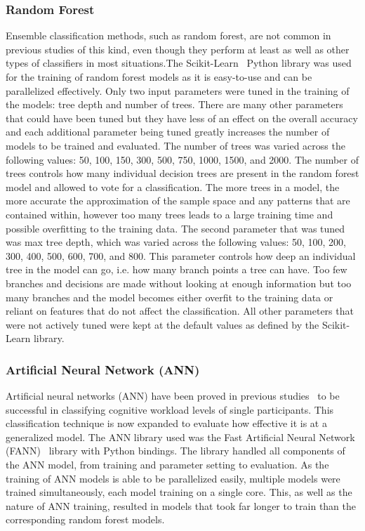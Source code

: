 \documentclass[11pt]{article}
\begin{document}
		\subsubsection{Random Forest}
		Ensemble classification methods, such as random forest, are not common in previous studies of this kind, even though they perform at least as well as other types of classifiers in most situations.The Scikit-Learn~\cite{Scikit} Python library was used for the training of random forest models as it is easy-to-use and can be parallelized effectively. Only two input parameters were tuned in the training of the models: tree depth and number of trees. There are many other parameters that could have been tuned but they have less of an effect on the overall accuracy and each additional parameter being tuned greatly increases the number of models to be trained and evaluated. The number of trees was varied across the following values: 50, 100, 150, 300, 500, 750, 1000, 1500, and 2000. The number of trees controls how many individual decision trees are present in the random forest model and allowed to vote for a classification. The more trees in a model, the more accurate the approximation of the sample space and any patterns that are contained within, however too many trees leads to a large training time and possible overfitting to the training data. The second parameter that was tuned was max tree depth, which was varied across the following values: 50, 100, 200, 300, 400, 500, 600, 700, and 800. This parameter controls how deep an individual tree in the model can go, i.e. how many branch points a tree can have. Too few branches and decisions are made without looking at enough information but too many branches and the model becomes either overfit to the training data or reliant on features that do not affect the classification. All other parameters that were not actively tuned were kept at the default values as defined by the Scikit-Learn library.
		
		\subsubsection{Artificial Neural Network (ANN)}
		Artificial neural networks (ANN) have been proved in previous studies~\cite{Wilson, Estepp_2015} to be successful in classifying cognitive workload levels of single participants. This classification technique is now expanded to evaluate how effective it is at a generalized model. The ANN library used was the Fast Artificial Neural Network (FANN)~\cite{FANN} library with Python bindings. The library handled all components of the ANN model, from training and parameter setting to evaluation. As the training of ANN models is able to be parallelized easily, multiple models were trained simultaneously, each model training on a single core. This, as well as the nature of ANN training, resulted in models that took far longer to train than the corresponding random forest models.
		
\end{document}

